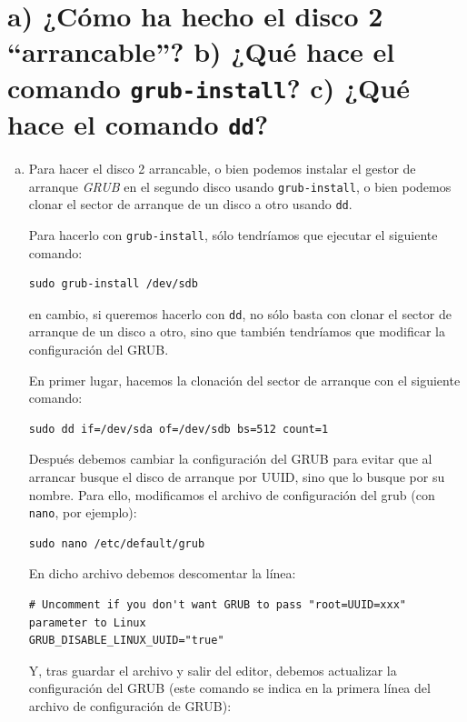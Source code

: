 \documentclass[10pt,a4paper,spanish]{article}
\numberwithin{equation}{section} %
\numberwithin{figure}{section} %
\numberwithin{table}{section} %
\begin{document}
\section{a) ¿Cómo ha hecho el disco 2 ``arrancable''? b) ¿Qué hace el comando \texttt{grub-install}? c) ¿Qué hace el comando \texttt{dd}?}
\begin{enumerate}[a)]
\item Para hacer el disco 2 arrancable, o bien podemos instalar el gestor de arranque \textit{GRUB} en el segundo disco usando \texttt{grub-install}, o bien podemos clonar el sector de arranque de un disco a otro usando \texttt{dd}.

Para hacerlo con \texttt{grub-install}, sólo tendríamos que ejecutar el siguiente comando:

\begin{verbatim}
sudo grub-install /dev/sdb
\end{verbatim}

en cambio, si queremos hacerlo con \texttt{dd}, no sólo basta con clonar el sector de arranque de un disco a otro, sino que también tendríamos que modificar la configuración del GRUB.

En primer lugar, hacemos la clonación del sector de arranque con el siguiente comando:

\begin{verbatim}
sudo dd if=/dev/sda of=/dev/sdb bs=512 count=1
\end{verbatim}

Después debemos cambiar la configuración del GRUB para evitar que al arrancar busque el disco de arranque por UUID, sino que lo busque por su nombre. Para ello, modificamos el archivo de configuración del grub (con \texttt{nano}, por ejemplo):

\begin{verbatim}
sudo nano /etc/default/grub
\end{verbatim}

En dicho archivo debemos descomentar la línea:
\begin{verbatim}
# Uncomment if you don't want GRUB to pass "root=UUID=xxx" parameter to Linux
GRUB_DISABLE_LINUX_UUID="true"
\end{verbatim}

Y, tras guardar el archivo y salir del editor, debemos actualizar la configuración del GRUB (este comando se indica en la primera línea del archivo de configuración de GRUB):


\end{enumerate}
\end{document}
